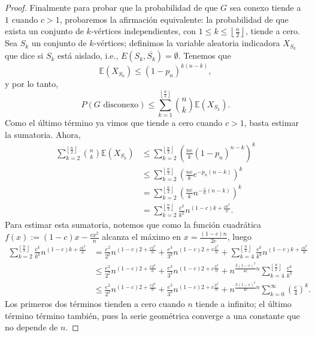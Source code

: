 \documentclass[12pt]{report}
\theoremstyle{plain}
\theoremstyle{definition}
\renewcommand{\bar}[1]{\overline{#1}}
\newcommand{\floor}[1]{\left\lfloor #1  \right\rfloor}
\begin{document}
\begin{proof}
\bigskip


Finalmente para probar que la probabilidad de que $G$ sea conexo tiende a $1$ cuando $c >1$, probaremos la afirmación equivalente: la probabilidad de que exista un conjunto de $k$-vértices independientes, con $1 \leq k \leq \floor{\frac n 2}$, tiende a cero. Sea $S_k$ un conjunto de $k$-vértices; definimos la variable aleatoria indicadora $X_{S_k}$ que dice si $S_k$ está aislado, i.e., $E(S_k, \bar{S_k}) = \emptyset$. Tenemos que
\[
    \mathbb{E} (X_{S_k}) \leq (1 - p_n)^{k (n-k)} ,
\]
y por lo tanto,
\[
    P( G \text{ disconexo}) \leq \sum_{k = 1}^{\floor{\frac n 2}} \binom n k \mathbb{E}(X_{S_k}).
\]
Como el último término ya vimos que tiende a cero cuando $c > 1$, basta estimar la sumatoria. Ahora,
\begin{align*}
\sum_{k = 2}^{\floor{\frac n 2}} \binom n k \mathbb{E} (X_{S_k}) &\leq \sum_{k = 2}^{\floor{\frac n 2}} \left (\frac{ne}{k} (1-p_n)^{n-k} \right )^k \\
&\leq \sum_{k = 2}^{\floor{\frac n 2}} \left (\frac{ne}{k} e^{-p_n(n-k)} \right )^k \\
&= \sum_{k = 2}^{\floor{\frac n 2}} \left ( \frac{n e}{k} n^{- \frac c n (n-k)} \right )^k \\
&= \sum_{k = 2}^{\floor{\frac n 2}}  \frac{ e^k}{k^k} n^{(1- c)k +  \frac{c k^2}{n}}.
\end{align*}
Para estimar esta sumatoria, notemos que como la función cuadrática $f(x) := (1-c)x - \frac{c x^2}{n}$ alcanza el máximo en $x = \frac{(1-c)n}{2c}$, luego
\begin{align*}
\sum_{k = 2}^{\floor{\frac n 2}} \frac{ e^k}{k^k} n^{(1- c)k +  \frac{c k^2}{n}} &= \frac{e^2}{2^2} n^{(1-c) 2 + \frac{c 2^2}{n}} + \frac{e^3}{3^3} n^{(1-c) 2 + c\frac{3^3}{n}}  + \sum_{k = 4}^{\floor{\frac n 2}} \frac{ e^k}{k^k} n^{(1- c)k +  \frac{c k^2}{n}} \\
&\leq \frac{e^2}{2^2} n^{(1-c) 2 + \frac{c 2^2}{n}} + \frac{e^3}{3^3} n^{(1-c) 2 + c\frac{3^3}{n}}  + n^{\frac{3 (1-c)^2}{4 c}n} \sum_{k = 4}^{\floor{\frac n 2}} \frac{ e^k}{k^k}\\
&\leq \frac{e^2}{2^2} n^{(1-c) 2 + \frac{c 2^2}{n}} + \frac{e^3}{3^3} n^{(1-c) 2 + c\frac{3^3}{n}}  + n^{\frac{3 (1-c)^2}{4 c}n} \sum_{k = 0}^{\infty} \left ( \frac{ e}{4} \right)^k .
\end{align*}
Los primeros dos términos tienden a cero cuando $n$ tiende a infinito; el último término término también, pues la serie geométrica converge a una constante que no depende de $n$.

\end{proof}
\end{document}
